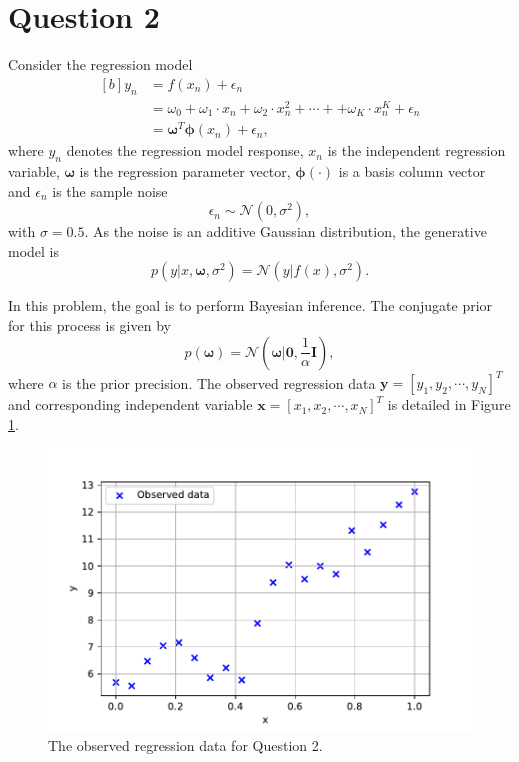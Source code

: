 \documentclass{article}
\begin{document}
\clearpage

\section{Question 2}
Consider the regression model
\begin{equation}
\begin{aligned}[b]
y_n &= f(x_n) + \epsilon_n \\
&= \omega_0 + \omega_1 \cdot x_n + \omega_2 \cdot x_n^2 + \cdots +  + \omega_K \cdot x_n^{K} + \epsilon_n \\
&= \boldsymbol\omega^T \boldsymbol\phi(x_n) + \epsilon_n,
\end{aligned}
\end{equation}
where $y_n$ denotes the regression model response, $x_n$ is the independent regression variable, $\boldsymbol\omega$ is the regression parameter vector, $\boldsymbol\phi(\cdot)$ is a basis column vector and $\epsilon_n$ is the sample noise
\begin{equation}
\epsilon_n \sim \mathcal{N}(0, \sigma^2),
\end{equation}
with $\sigma = 0.5$. As the noise is an additive Gaussian distribution, the generative model is
\begin{equation}
p(y\vert x, \boldsymbol\omega, \sigma^2) = \mathcal{N}(y \vert f(x), \sigma^2).
\end{equation}

In this problem, the goal is to perform Bayesian inference. The conjugate prior for this process is given by
\begin{equation}
p(\boldsymbol\omega) = \mathcal{N}(\boldsymbol\omega \vert \mathbf{0}, \frac{1}{\alpha} \mathbf{I}),
\end{equation}
where $\alpha$ is the prior precision. The observed regression data $\mathbf{y} = [y_1, y_2, \cdots, y_N]^T$ and corresponding independent variable $\mathbf{x} = [x_1, x_2, \cdots, x_N]^T$ is detailed in Figure \ref{fig:Q2_data}.
\begin{figure}[htb!]
\centering
\includegraphics[scale=0.5]{Q2_1.pdf}
\caption{The observed regression data for Question 2.}
\label{fig:Q2_data}
\end{figure}
\end{document}
